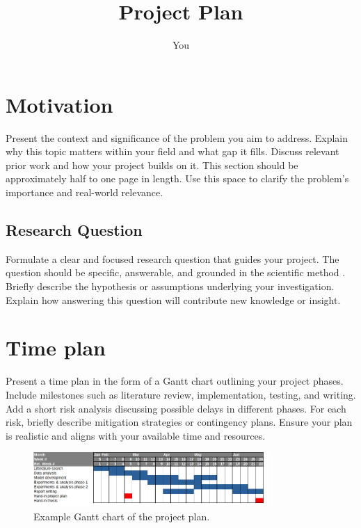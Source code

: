 \documentclass{article}
\title{Project Plan}
\author{You}
\begin{document}
\maketitle

\section*{Motivation}
Present the context and significance of the problem you aim to address.
Explain why this topic matters within your field and what gap it fills.
Discuss relevant prior work and how your project builds on it.
This section should be approximately half to one page in length.
Use this space to clarify the problem’s importance and real-world relevance.

\subsection*{Research Question}
Formulate a clear and focused research question that guides your project.
The question should be specific, answerable, and grounded in the scientific method \cite{scientific_method}.
Briefly describe the hypothesis or assumptions underlying your investigation.
Explain how answering this question will contribute new knowledge or insight.

\section*{Time plan}
Present a time plan in the form of a Gantt chart outlining your project phases.
Include milestones such as literature review, implementation, testing, and writing.
Add a short risk analysis discussing possible delays in different phases.
For each risk, briefly describe mitigation strategies or contingency plans.
Ensure your plan is realistic and aligns with your available time and resources.

\begin{figure}
\centering
\includegraphics[width=0.8\textwidth]{time_plan.png}
\caption{Example Gantt chart of the project plan.}
\end{figure}

\newpage

\nocite{*}


\end{document}
